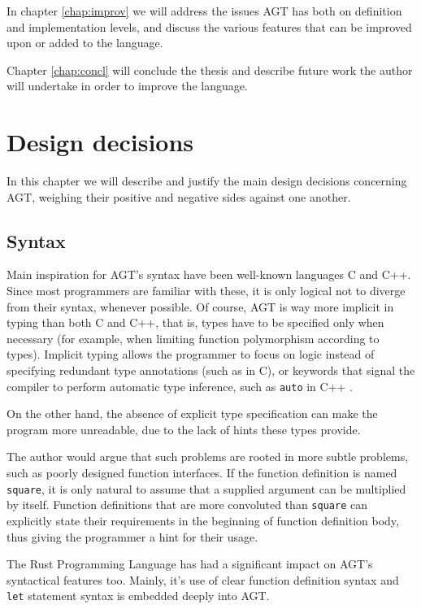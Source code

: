 \documentclass[times, utf8, diplomski]{fer}
\theoremstyle{definition}
\begin{document}
In chapter \ref{chap:improv} we will address the issues AGT has both on
definition and implementation levels, and discuss the various features that can
be improved upon or added to the language.

Chapter \ref{chap:concl} will conclude the thesis and describe future work the
author will undertake in order to improve the language.

\chapter{Design decisions}\label{chap:design}

In this chapter we will describe and justify the main design decisions concerning AGT,
weighing their positive and negative sides against one another.

\section{Syntax}

Main inspiration for AGT's syntax have been well-known languages C and C++.
Since most programmers are familiar with these, it is only logical not to diverge from their syntax,
whenever possible.
Of course, AGT is way more implicit in typing than both C and C++, that is, types have to be specified
only when necessary (for example, when limiting function polymorphism according to types).
Implicit typing allows the programmer to focus on logic instead of specifying redundant type annotations
(such as in C), or keywords that signal the compiler to perform automatic type
inference, such as \texttt{auto} in C++ \citep{c_auto}.

On the other hand, the absence of explicit type specification can make the program more unreadable,
due to the lack of hints these types provide. 

The author would argue that such problems are
rooted in more subtle problems, such as poorly designed function interfaces.
If the function definition is named \texttt{square}, 
it is only natural to assume that a supplied argument can be multiplied by itself.
Function definitions that are more convoluted than \texttt{square} can explicitly state their requirements
in the beginning of function definition body, thus giving the programmer a hint for their usage. 

The Rust Programming Language has had a significant impact on AGT's syntactical features too.
Mainly, it's use of clear function definition syntax and \texttt{let} statement syntax is
embedded deeply into AGT.
\end{document}
